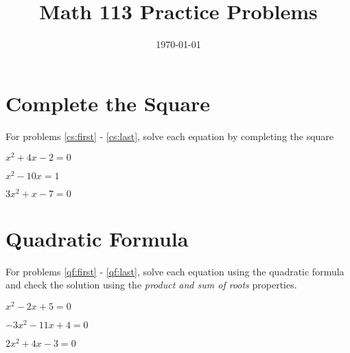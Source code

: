 \documentclass[fleqn,addpoints]{exam}
\title{Math 113 Practice Problems}
\author{}
\date{\today}
\begin{document}
\maketitle

\section{Complete the Square}

For problems \ref{cs:first} - \ref{cs:last}, solve each equation by completing the square

\begin{questions}

\question \( x^2 + 4x - 2 = 0 \) 
\label{cs:first}
\vspace{4 cm}


\question \( x^2 - 10x = 1 \) 
\vspace{4 cm}

\question \( 3x^2 + x - 7 = 0 \) 
\label{cs:last}
\vspace{4 cm}

\pagebreak
\section{Quadratic Formula}

For problems \ref{qf:first} - \ref{qf:last}, solve each equation using the quadratic formula and check the solution
using the {\em product and sum of roots} properties.  

\question \( x^2 - 2x + 5 = 0 \)
\label{qf:first}
\vspace{5 cm}

\question \( -3x^2 - 11x + 4 = 0 \)
\vspace{5 cm}

\question \( 2x^2 + 4x - 3 = 0 \)
\label{qf:last}
\vspace{5 cm}

\end{questions}
\end{document}
